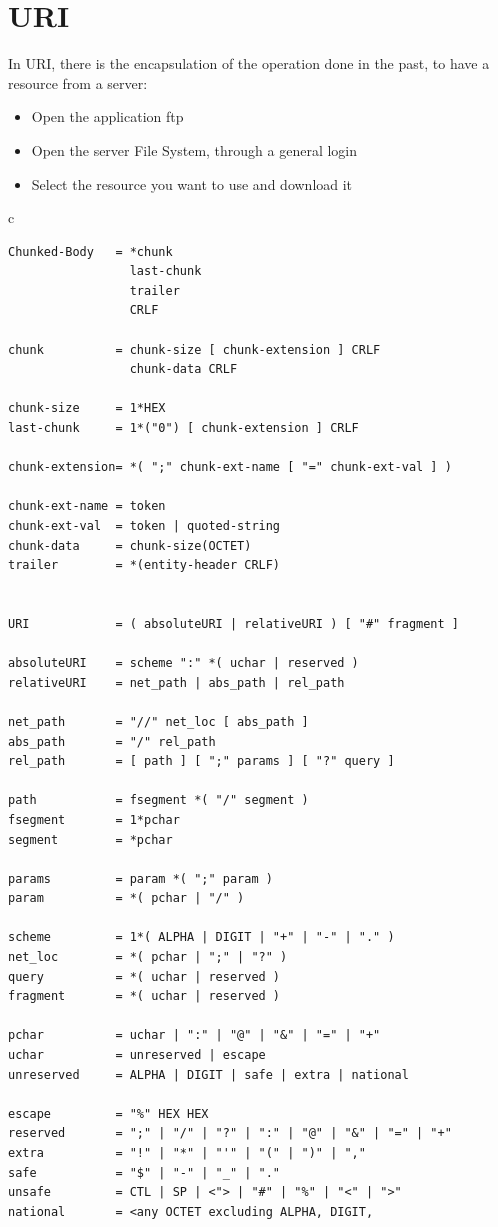 \section{URI}
In URI, there is the encapsulation of the operation done in the past, to have a resource from a server:
\begin{itemize}
\item{Open the application ftp}
\item{Open the server File System, through a general login}
\item{Select the resource you want to use and download it}
\end{itemize}
\begin{center}
\begin{tabular}{c}
\begin{lstlisting}[linewidth=320pt, basicstyle=\footnotesize\sffamily,]
Chunked-Body   = *chunk
                 last-chunk
                 trailer
                 CRLF

chunk          = chunk-size [ chunk-extension ] CRLF
                 chunk-data CRLF

chunk-size     = 1*HEX
last-chunk     = 1*("0") [ chunk-extension ] CRLF

chunk-extension= *( ";" chunk-ext-name [ "=" chunk-ext-val ] )

chunk-ext-name = token
chunk-ext-val  = token | quoted-string
chunk-data     = chunk-size(OCTET)
trailer        = *(entity-header CRLF)


URI            = ( absoluteURI | relativeURI ) [ "#" fragment ]

absoluteURI    = scheme ":" *( uchar | reserved )
relativeURI    = net_path | abs_path | rel_path

net_path       = "//" net_loc [ abs_path ]
abs_path       = "/" rel_path
rel_path       = [ path ] [ ";" params ] [ "?" query ]

path           = fsegment *( "/" segment )
fsegment       = 1*pchar
segment        = *pchar

params         = param *( ";" param )
param          = *( pchar | "/" )

scheme         = 1*( ALPHA | DIGIT | "+" | "-" | "." )
net_loc        = *( pchar | ";" | "?" )
query          = *( uchar | reserved )
fragment       = *( uchar | reserved )

pchar          = uchar | ":" | "@" | "&" | "=" | "+"
uchar          = unreserved | escape
unreserved     = ALPHA | DIGIT | safe | extra | national

escape         = "%" HEX HEX
reserved       = ";" | "/" | "?" | ":" | "@" | "&" | "=" | "+"
extra          = "!" | "*" | "'" | "(" | ")" | ","
safe           = "$" | "-" | "_" | "."
unsafe         = CTL | SP | <"> | "#" | "%" | "<" | ">"
national       = <any OCTET excluding ALPHA, DIGIT,
\end{lstlisting}
\end{tabular}
\end{center}
